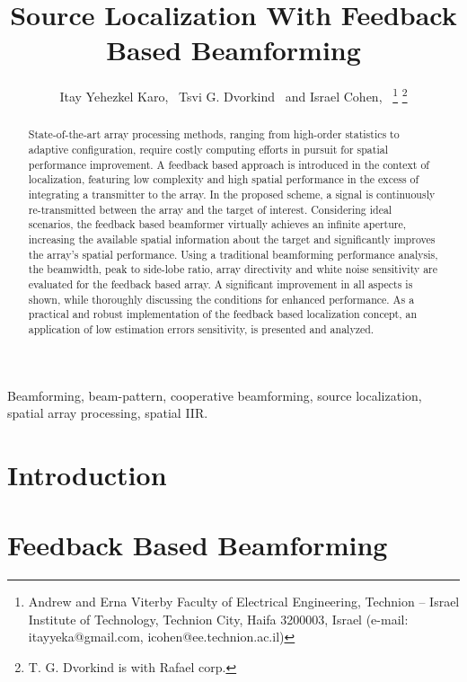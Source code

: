 \documentclass[journal]{IEEEtran}
\begin{document}
\title{Source Localization With Feedback Based Beamforming}
\author{Itay Yehezkel Karo,~\IEEEmembership{}
        Tsvi G. Dvorkind~\IEEEmembership{}
        and 
        Israel Cohen,~
\thanks{Andrew and Erna Viterby Faculty of Electrical Engineering, Technion -- Israel Institute of Technology, Technion City, Haifa 3200003, Israel (e-mail: itayyeka@gmail.com, icohen@ee.technion.ac.il)}%
\thanks{T. G. Dvorkind is with Rafael corp.}%
}
\markboth{}%
{}
\maketitle
\begin{abstract}
State-of-the-art array processing methods, ranging from high-order statistics to adaptive configuration, require costly computing efforts in pursuit for spatial performance improvement.
A feedback based approach is introduced in the context of localization, featuring low complexity and high spatial performance in the excess of integrating a transmitter to the array.  
In the proposed scheme, a signal is continuously re-transmitted between the array and the target of interest.
Considering ideal scenarios, the feedback based beamformer virtually achieves an infinite aperture, increasing the available spatial information about the target and significantly improves the array's spatial performance.
Using a traditional beamforming performance analysis, the beamwidth, peak to side-lobe ratio, array directivity and white noise sensitivity are evaluated for the feedback based array.
A significant improvement in all aspects is shown, while thoroughly discussing the conditions for enhanced performance.
As a practical and robust implementation of the feedback based localization concept, an application of low estimation errors sensitivity, 
is presented and analyzed.
\end{abstract}
\begin{IEEEkeywords}
Beamforming, beam-pattern, cooperative beamforming, source localization, spatial array processing, spatial IIR.
\end{IEEEkeywords}
\section{Introduction}

\section{Feedback Based Beamforming}
\label{sec_introduceFeedback}

\end{document}
